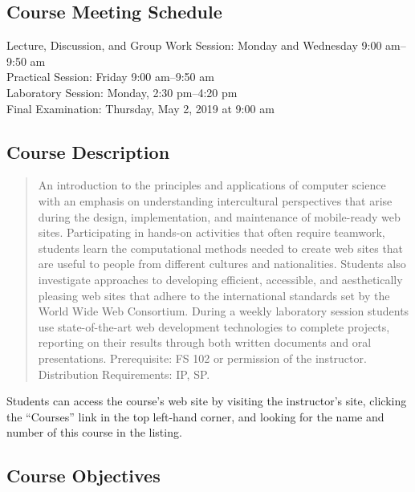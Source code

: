 \documentclass[11pt]{article}
\begin{document}
\subsection*{Course Meeting Schedule}

Lecture, Discussion, and Group Work Session: Monday and Wednesday 9:00 am--9:50 am \\
Practical Session: Friday 9:00 am--9:50 am \\
Laboratory Session: Monday, 2:30 pm--4:20 pm \\
Final Examination: Thursday, May 2, 2019 at 9:00 am

\subsection*{Course Description}

\begin{quote}

An introduction to the principles and applications of computer science with an
emphasis on understanding intercultural perspectives that arise during the
design, implementation, and maintenance of mobile-ready web sites. Participating
in hands-on activities that often require teamwork, students learn the
computational methods needed to create web sites that are useful to people from
different cultures and nationalities. Students also investigate approaches to
developing efficient, accessible, and aesthetically pleasing web sites that
adhere to the international standards set by the World Wide Web Consortium.
During a weekly laboratory session students use state-of-the-art web development
technologies to complete projects, reporting on their results through both
written documents and oral presentations. Prerequisite: FS 102 or permission of
the instructor. Distribution Requirements: IP, SP. \@ \\

\end{quote}

\noindent Students can access the course's web site by visiting the instructor's
site, clicking the ``Courses'' link in the top left-hand corner, and looking for
the name and number of this course in the listing.

\subsection*{Course Objectives}
\end{document}
